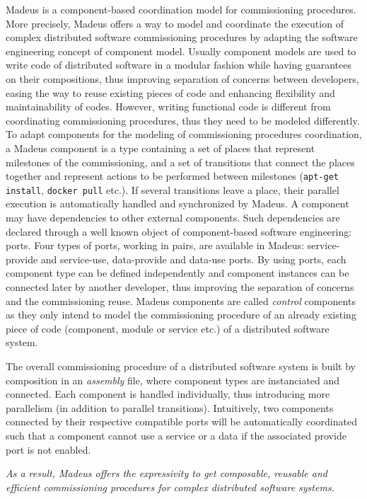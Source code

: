 Madeus is a component-based coordination model for commissioning
procedures. More precisely, Madeus offers a way to model and
coordinate the execution of complex distributed software commissioning
procedures by adapting the software engineering concept of component
model. Usually component models are used to write code of distributed
software in a modular fashion while having guarantees on their
compositions, thus improving separation of concerns between
developers, easing the way to reuse existing pieces of code and
enhancing flexibility and maintainability of codes. However, writing
functional code is different from coordinating commissioning
procedures, thus they need to be modeled differently. To adapt
components for the modeling of commissioning procedures coordination,
a Madeus component is a type containing a set of places that represent
milestones of the commissioning, and a set of transitions that connect
the places together and represent actions to be performed between
milestones (\eg \texttt{apt-get install}, \texttt{docker pull}
etc.). If several transitions leave a place, their parallel execution
is automatically handled and synchronized by Madeus. A component may
have dependencies to other external components. Such dependencies are
declared through a well known object of component-based software
engineering: ports. Four types of ports, working in pairs, are
available in Madeus: service-provide and service-use, data-provide and
data-use ports. By using ports, each component type can be defined
independently and component instances can be connected later by
another developer, thus improving the separation of concerns and the
commissioning reuse. Madeus components are called \emph{control}
components as they only intend to model the commissioning procedure of
an already existing piece of code (component, module or service etc.)
of a distributed software system.

The overall commissioning procedure of a distributed software system
is built by composition in an \emph{assembly} file, where component
types are instanciated and connected. Each component is handled
individually, thus introducing more parallelism (in addition to
parallel transitions). Intuitively, two components connected by their
respective compatible ports will be automatically coordinated such
that a component cannot use a service or a data if the associated
provide port is not enabled.

\emph{As a result, Madeus offers the expressivity to get composable,
reusable and efficient commissioning procedures for complex
distributed software systems.}

